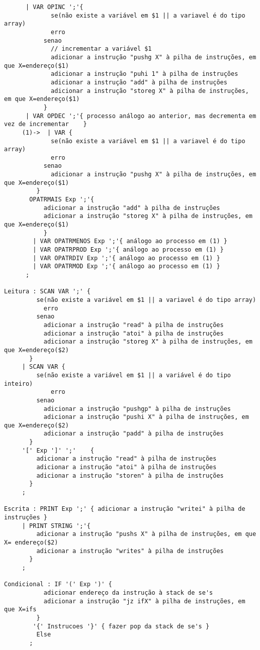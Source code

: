 \documentclass{report}
\begin{document}
\begin{verbatim}
      | VAR OPINC ';'{
             se(não existe a variável em $1 || a variavel é do tipo array)
             erro
           senao
             // incrementar a variável $1
             adicionar a instrução "pushg X" à pilha de instruções, em que X=endereço($1)
             adicionar a instrução "puhi 1" à pilha de instruções
             adicionar a instrução "add" à pilha de instruções
             adicionar a instrução "storeg X" à pilha de instruções, em que X=endereço($1)
           }
      | VAR OPDEC ';'{ processo análogo ao anterior, mas decrementa em vez de incrementar    }
     (1)->  | VAR {
             se(não existe a variável em $1 || a variavel é do tipo array)
             erro
           senao
             adicionar a instrução "pushg X" à pilha de instruções, em que X=endereço($1)
         }
       OPATRMAIS Exp ';'{
           adicionar a instrução "add" à pilha de instruções
           adicionar a instrução "storeg X" à pilha de instruções, em que X=endereço($1)
           }
        | VAR OPATRMENOS Exp ';'{ análogo ao processo em (1) }
        | VAR OPATRPROD Exp ';'{ análogo ao processo em (1) }
        | VAR OPATRDIV Exp ';'{ análogo ao processo em (1) }
        | VAR OPATRMOD Exp ';'{ análogo ao processo em (1) }
      ;
 
Leitura : SCAN VAR ';' {
         se(não existe a variável em $1 || a variavel é do tipo array)
           erro
         senao
           adicionar a instrução "read" à pilha de instruções
           adicionar a instrução "atoi" à pilha de instruções
           adicionar a instrução "storeg X" à pilha de instruções, em que X=endereço($2)
       }
     | SCAN VAR {
         se(não existe a variável em $1 || a variável é do tipo inteiro)
             erro
         senao
           adicionar a instrução "pushgp" à pilha de instruções
           adicionar a instrução "pushi X" à pilha de instruções, em que X=endereço($2)
           adicionar a instrução "padd" à pilha de instruções
       }
     '[' Exp ']' ';'    {
         adicionar a instrução "read" à pilha de instruções
         adicionar a instrução "atoi" à pilha de instruções
         adicionar a instrução "storen" à pilha de instruções
       }
     ;
 
Escrita : PRINT Exp ';' { adicionar a instrução "writei" à pilha de instruções }
     | PRINT STRING ';'{       
         adicionar a instrução "pushs X" à pilha de instruções, em que X= endereço($2)
         adicionar a instrução "writes" à pilha de instruções
       }
     ;
 
Condicional : IF '(' Exp ')' {
           adicionar endereço da instrução à stack de se's
           adicionar a instrução "jz ifX" à pilha de instruções, em que X=ifs
         }
        '{' Instrucoes '}' { fazer pop da stack de se's }
         Else
       ;
 

\end{verbatim}
\end{document}

